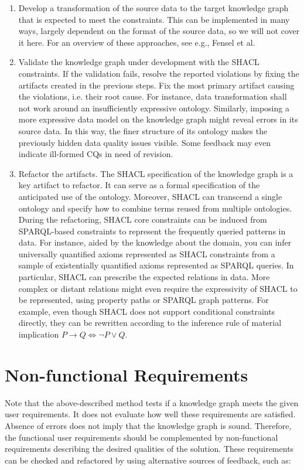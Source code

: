 \documentclass[
]{ceurart}
\begin{document}
\begin{enumerate}
    \item Develop a transformation of the source data to the target knowledge graph that is expected to meet the constraints. This can be implemented in many ways, largely dependent on the format of the source data, so we will not cover it here. For an overview of these approaches, see e.g., Fensel et al. \cite{Fensel2020b}
    \item Validate the knowledge graph under development with the SHACL constraints. If the validation fails, resolve the reported violations by fixing the artifacts created in the previous steps. Fix the most primary artifact causing the violations, i.e. their root cause. For instance, data transformation shall not work around an insufficiently expressive ontology. Similarly, imposing a more expressive data model on the knowledge graph might reveal errors in its source data. In this way, the finer structure of its ontology makes the previously hidden data quality issues visible. Some feedback may even indicate ill-formed CQs in need of revision.
    \item Refactor the artifacts. The SHACL specification of the knowledge graph is a key artifact to refactor. It can serve as a formal specification of the anticipated use of the ontology. Moreover, SHACL can transcend a single ontology and specify how to combine terms reused from multiple ontologies. During the refactoring, SHACL core constraints can be induced from SPARQL-based constraints to represent the frequently queried patterns in data. For instance, aided by the knowledge about the domain, you can infer universally quantified axioms represented as SHACL constraints from a sample of existentially quantified axioms represented as SPARQL queries. In particular, SHACL can prescribe the expected relations in data. More complex or distant relations might even require the expressivity of SHACL to be represented, using property paths or SPARQL graph patterns. For example, even though SHACL does not support conditional constraints directly, they can be rewritten according to the inference rule of material implication ${P\to Q\Leftrightarrow \neg P\lor Q}$.
\end{enumerate}

\section{Non-functional Requirements}

Note that the above-described method tests if a knowledge graph meets the given user requirements. It does not evaluate how well these requirements are satisfied. Absence of errors does not imply that the knowledge graph is sound. Therefore, the functional user requirements should be complemented by non-functional requirements describing the desired qualities of the solution. These requirements can be checked and refactored by using alternative sources of feedback, such as:
\end{document}
